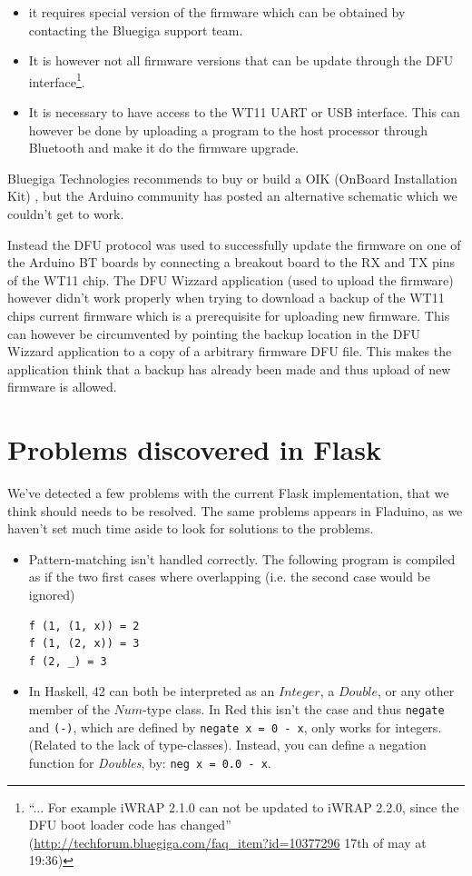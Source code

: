 \documentclass[a4paper, oneside, final]{memoir}
\begin{document}
\begin{itemize}
\item it requires special version of the firmware which can be obtained by
  contacting the Bluegiga support team.

\item It is however not all firmware versions that can be update through the DFU
  interface\footnote{``... For example iWRAP 2.1.0 can not be updated to iWRAP
    2.2.0, since the DFU boot loader code has changed''
    (\url{http://techforum.bluegiga.com/faq_item?id=10377296} 17th of may at
    19:36)}.

\item It is necessary to have access to the WT11 UART or USB
  interface. This can however be done by uploading a program to the host
  processor through Bluetooth and make it do the firmware upgrade.
\end{itemize}

Bluegiga Technologies recommends to buy or build a OIK (OnBoard Installation
Kit) \cite{oik_chematic}, but the Arduino community has posted an alternative
schematic \cite{oik_chematic_arduino} which we couldn't get to work.

Instead the DFU protocol was used to successfully update the firmware on one of
the Arduino BT boards by connecting a breakout board to the RX and TX pins of
the WT11 chip. The DFU Wizzard application (used to upload the firmware) however
didn't work properly when trying to download a backup of the WT11 chips current
firmware which is a prerequisite for uploading new firmware. This can however be
circumvented by pointing the backup location in the DFU Wizzard application to a
copy of a arbitrary firmware DFU file. This makes the application think that a
backup has already been made and thus upload of new firmware is allowed.

\chapter{Problems discovered in Flask }
We've detected a few problems with the current Flask implementation,
that we think should needs to be resolved. The same problems appears
in Fladuino, as we haven't set much time aside to look for solutions
to the problems.

\begin{itemize}
\item Pattern-matching isn't handled correctly. The following program
  is compiled as if the two first cases where overlapping (i.e. the
  second case would be ignored)
\begin{verbatim}
f (1, (1, x)) = 2
f (1, (2, x)) = 3
f (2, _) = 3
\end{verbatim}

\item In Haskell, 42 can both be interpreted as an $Integer$, a
  $Double$, or any other member of the $Num$-type class. In Red this
  isn't the case and thus \texttt{negate} and \texttt{(-)}, which
  are defined by \verb|negate x = 0 - x|, only works for
  integers.(Related to the lack of type-classes). Instead, you can
  define a negation function for \textit{Doubles}, by: \verb|neg x = 0.0 - x|.
\end{itemize}
\end{document}
